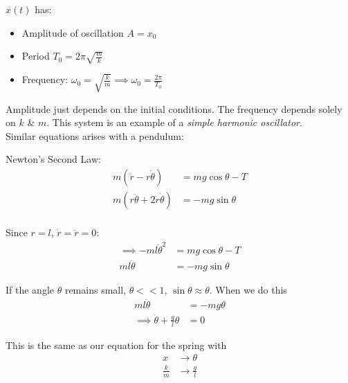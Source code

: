 \documentclass[10pt]{scrartcl}
\begin{document}
$x(t)$ has:
\begin{itemize}
  \item Amplitude of oscillation $A = x_0$
  \item Period $T_0 = 2\pi\sqrt{\frac{m}{k}}$
  \item Frequency: $\omega_0 = \sqrt{\frac{k}{m}} \implies \omega_0 = \frac{2\pi}{T_0}$
\end{itemize}

Amplitude just depends on the initial conditions. The frequency depends solely on $k$ \& $m$. This system is an example of a \emph{simple harmonic oscillator}.\\

 Similar equations arises with a pendulum:
\begin{center}
\end{center}

Newton's Second Law:
\[
\begin{aligned}
  m(\ddot{r} - r\dot{\theta}) &= mg\cos\theta - T\\
  m(r\ddot{\theta} + 2\dot{r}\dot{\theta}) &= -mg\sin\theta\\
\end{aligned}
\]

Since $r = l$, $\dot{r} = \ddot{r} = 0$:
\[
\begin{aligned}
  \implies -ml\dot{\theta}^2 &= mg\cos\theta - T\\
  ml\ddot{\theta} &= -mg\sin\theta 
\end{aligned}
\]

If the angle $\theta$ remains small, $\theta << 1$, $\sin\theta \approx \theta$. When we do this 
\[
\begin{aligned}
  ml\ddot{\theta} &= -mg\theta\\
  \implies \ddot{\theta} + \frac{g}{l}\theta &= 0 
\end{aligned}
\]

This is the same as our equation for the spring with 
\[
\begin{aligned}
  x &\longrightarrow \theta\\
  \frac{k}{m} &\longrightarrow \frac{g}{l}
\end{aligned}
\]
\end{document}

